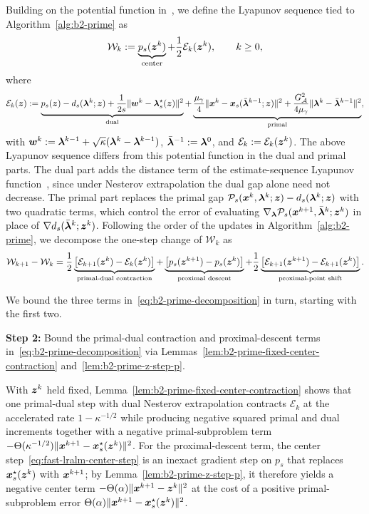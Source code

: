 Building on the potential function
in~\cite{zhang2020proximal,zhang2020smoothed,li2026smoothing}, we define the
Lyapunov sequence tied to Algorithm~\ref{alg:b2-prime} as
\[
    \mathcal W_k:=\underbrace{p_s(\bm{z}^k)}_{\text{center}}
    +\frac12\mathcal E_k(\bm{z}^k),\qquad k\ge0,
\]
where
\[
    \mathcal E_k(\bm{z})
    :=\underbrace{p_s(\bm{z})-d_s(\bm{\lambda}^k;\bm{z})
    +\frac{1}{2s}\|\bm{w}^k-\bm{\lambda}_s^\star(\bm{z})\|^2}_{\text{dual}}
    +\underbrace{\frac{\mu_\gamma}{4}\|\bm{x}^k-\bm{x}_s(\bar{\bm{\lambda}}^{k-1};\bm{z})\|^2
    +\frac{G_{\mathcal{A}}^2}{4\mu_\gamma}\|\bm{\lambda}^k-\bar{\bm{\lambda}}^{k-1}\|^2}_{\text{primal}},
\]
with \(\bm{w}^k:=\bm{\lambda}^{k-1}+\sqrt{\kappa}(\bm{\lambda}^k-\bm{\lambda}^{k-1})\),
\(\bar{\bm{\lambda}}^{-1}:=\bm{\lambda}^0\), and \(\mathcal E_k:=\mathcal E_k(\bm{z}^k)\).
The above Lyapunov sequence differs from this potential function in the dual and
primal parts. The dual part adds
the distance term of the estimate-sequence Lyapunov
function~\cite{nesterov2018lectures,wilson2021lyapunov}, since under Nesterov
extrapolation the dual gap alone need not decrease. The primal part replaces
the primal gap \(\mathcal P_s(\bm{x}^k,\bm{\lambda}^k;\bm{z})-d_s(\bm{\lambda}^k;\bm{z})\) with two
quadratic terms, which control the error of evaluating
\(\nabla_{\bm{\lambda}}\mathcal P_s(\bm{x}^{k+1},\bar{\bm{\lambda}}^k;\bm{z}^k)\) in place of
\(\nabla d_s(\bar{\bm{\lambda}}^k;\bm{z}^k)\).
Following the order of the updates in Algorithm~\ref{alg:b2-prime}, we
decompose the one-step change of \(\mathcal W_k\) as
\begin{equation}
    \mathcal W_{k+1}-\mathcal W_k
    =\frac12\underbrace{\bigl[\mathcal E_{k+1}(\bm{z}^k)-\mathcal E_k(\bm{z}^k)\bigr]}_{\text{primal-dual contraction}}
    +\underbrace{\bigl[p_s(\bm{z}^{k+1})-p_s(\bm{z}^k)\bigr]}_{\text{proximal descent}}
    +\frac12\underbrace{\bigl[\mathcal E_{k+1}(\bm{z}^{k+1})-\mathcal E_{k+1}(\bm{z}^k)\bigr]}_{\text{proximal-point shift}}.
    \label{eq:b2-prime-decomposition}
\end{equation}

We bound the three terms in~\eqref{eq:b2-prime-decomposition} in turn,
starting with the first two.
\begin{stepbox}
\textbf{Step 2:} Bound the primal-dual contraction and proximal-descent
terms in~\eqref{eq:b2-prime-decomposition} via
Lemmas~\ref{lem:b2-prime-fixed-center-contraction}
and~\ref{lem:b2-prime-z-step-p}.
\end{stepbox}

With \(\bm{z}^k\) held fixed, Lemma~\ref{lem:b2-prime-fixed-center-contraction}
shows that one primal-dual step with dual Nesterov extrapolation contracts
\(\mathcal E_k\) at the accelerated rate \(1-\kappa^{-1/2}\) while producing
negative squared primal and dual increments together with a negative
primal-subproblem term \(-\Theta(\kappa^{-1/2})\|\bm{x}^{k+1}-\bm{x}_s^\star(\bm{z}^k)\|^2\).
For the proximal-descent term, the center step~\eqref{eq:fast-lralm-center-step}
is an inexact gradient step on \(p_s\) that replaces \(\bm{x}_s^\star(\bm{z}^k)\)
with \(\bm{x}^{k+1}\); by Lemma~\ref{lem:b2-prime-z-step-p}, it therefore yields a
negative center term \(-\Theta(\alpha)\|\bm{x}^{k+1}-\bm{z}^k\|^2\) at the cost of a
positive primal-subproblem error \(\Theta(\alpha)\|\bm{x}^{k+1}-\bm{x}_s^\star(\bm{z}^k)\|^2\).

